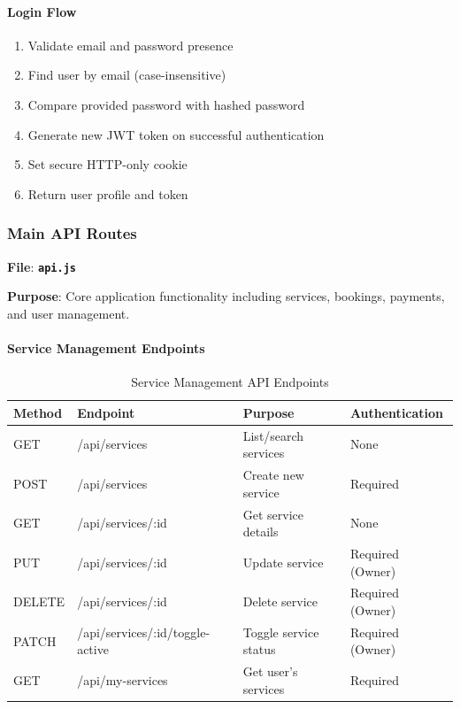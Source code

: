 \documentclass[12pt,a4paper]{article}
\newcommand{\file}[1]{\textbf{\texttt{#1}}}
\begin{document}
\paragraph{Login Flow}
\begin{enumerate}
\item Validate email and password presence
\item Find user by email (case-insensitive)
\item Compare provided password with hashed password
\item Generate new JWT token on successful authentication
\item Set secure HTTP-only cookie
\item Return user profile and token
\end{enumerate}

\subsubsection{Main API Routes}
\label{subsubsec:main-api-routes}

\textbf{File}: \file{api.js}

\textbf{Purpose}: Core application functionality including services, bookings, payments, and user management.

\paragraph{Service Management Endpoints}
\begin{table}[H]
\centering
\small
\begin{tabular}{@{}llll@{}}
\toprule
\textbf{Method} & \textbf{Endpoint} & \textbf{Purpose} & \textbf{Authentication} \\
\midrule
GET & /api/services & List/search services & None \\
POST & /api/services & Create new service & Required \\
GET & /api/services/:id & Get service details & None \\
PUT & /api/services/:id & Update service & Required (Owner) \\
DELETE & /api/services/:id & Delete service & Required (Owner) \\
PATCH & /api/services/:id/toggle-active & Toggle service status & Required (Owner) \\
GET & /api/my-services & Get user's services & Required \\
\bottomrule
\end{tabular}
\caption{Service Management API Endpoints}
\label{tab:service-endpoints}
\end{table}
\end{document}
